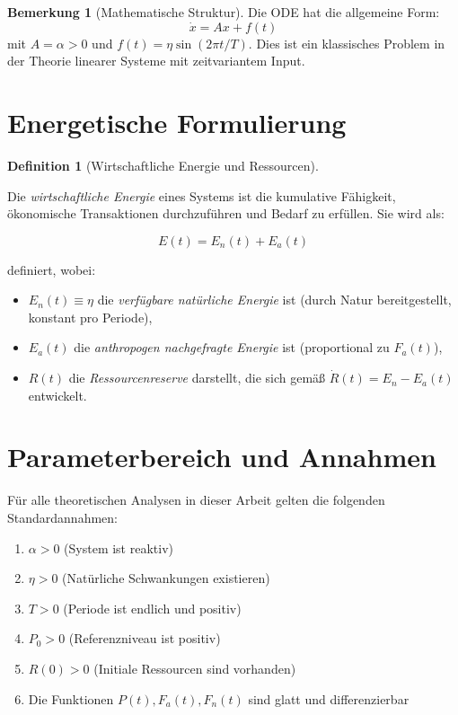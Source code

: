 \documentclass[a4paper,11pt]{report}
\theoremstyle{definition}
\newtheorem{definition}{Definition}[chapter]
\newtheorem{bemerkung}{Bemerkung}[chapter]
\begin{document}
\begin{bemerkung}[Mathematische Struktur]
    
    Die ODE hat die allgemeine Form:
    \begin{equation}
        \dot{x} = Ax + f(t)
    \end{equation}
    mit $A = \alpha > 0$ und $f(t) = \eta \sin(2\pi t / T)$. Dies ist ein klassisches Problem in der Theorie linearer Systeme mit zeitvariantem Input.
\end{bemerkung}

\section{Energetische Formulierung}

\begin{definition}[Wirtschaftliche Energie und Ressourcen]\label{def:energie}
    
    Die \emph{wirtschaftliche Energie} eines Systems ist die kumulative Fähigkeit, ökonomische Transaktionen durchzuführen und Bedarf zu erfüllen. Sie wird als:
    
    \begin{equation}
        E(t) = E_n(t) + E_a(t)
    \end{equation}
    
    definiert, wobei:
    \begin{itemize}
        \item $E_n(t) \equiv \eta$ die \emph{verfügbare natürliche Energie} ist (durch Natur bereitgestellt, konstant pro Periode),
        \item $E_a(t)$ die \emph{anthropogen nachgefragte Energie} ist (proportional zu $F_a(t)$),
        \item $R(t)$ die \emph{Ressourcenreserve} darstellt, die sich gemäß $\dot{R}(t) = E_n - E_a(t)$ entwickelt.
    \end{itemize}
\end{definition}

\section{Parameterbereich und Annahmen}

Für alle theoretischen Analysen in dieser Arbeit gelten die folgenden Standardannahmen:

\begin{enumerate}
    \item $\alpha > 0$ (System ist reaktiv)
    \item $\eta > 0$ (Natürliche Schwankungen existieren)
    \item $T > 0$ (Periode ist endlich und positiv)
    \item $P_0 > 0$ (Referenzniveau ist positiv)
    \item $R(0) > 0$ (Initiale Ressourcen sind vorhanden)
    \item Die Funktionen $P(t), F_a(t), F_n(t)$ sind glatt und differenzierbar
\end{enumerate}
\end{document}
